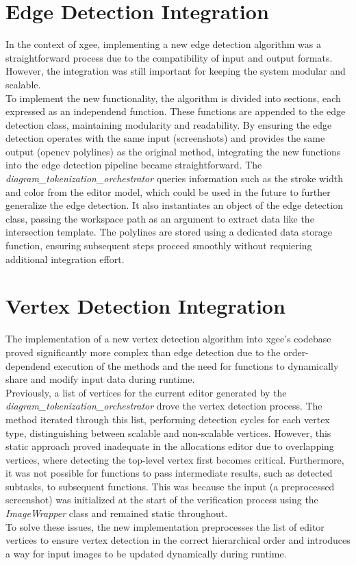 \section{Edge Detection Integration}
In the context of \acrshort{xgee}, implementing a new edge detection algorithm was a straightforward process due to the compatibility of input and output formats. However, the integration was still important for keeping the system modular and scalable.\\
To implement the new functionality, the algorithm is divided into sections, each expressed as an independend function. These functions are appended to the edge detection class, maintaining modularity and readability. By ensuring the edge detection operates with the same input (screenshots) and provides the same output (\acrshort{opencv} polylines) as the original method, integrating the new functions into the edge detection pipeline became straightforward.
The \textit{diagram\_tokenization\_orchestrator} queries information such as the stroke width and color from the editor model, which could be used in the future to further generalize the edge detection. It also instantiates an object of the edge detection class, passing the workspace path as an argument to extract data like the intersection template. The polylines are stored using a dedicated data storage function, ensuring subsequent steps proceed smoothly without requiering additional integration effort.
\newpage

\section{Vertex Detection Integration}
The implementation of a new vertex detection algorithm into \acrshort{xgee}'s codebase proved significantly more complex than edge detection due to the order-dependend execution of the methods and the need for functions to dynamically share and modify input data during runtime.\\
Previously, a list of vertices for the current editor generated by the \textit{diagram\_tokenization\_orchestrator} drove the vertex detection process. The method iterated through this list, performing detection cycles for each vertex type, distinguishing between scalable and non-scalable vertices. However, this static approach proved inadequate in the allocations editor due to overlapping vertices, where detecting the top-level vertex first becomes critical. Furthermore, it was not possible for functions to pass intermediate results, such as detected subtasks, to subsequent functions. This was because the input (a preprocessed screenshot) was initialized at the start of the verification process using the \textit{ImageWrapper} class and remained static throughout.\\
To solve these issues, the new implementation preprocesses the list of editor vertices to ensure vertex detection in the correct hierarchical order and introduces a way for input images to be updated dynamically during runtime.

